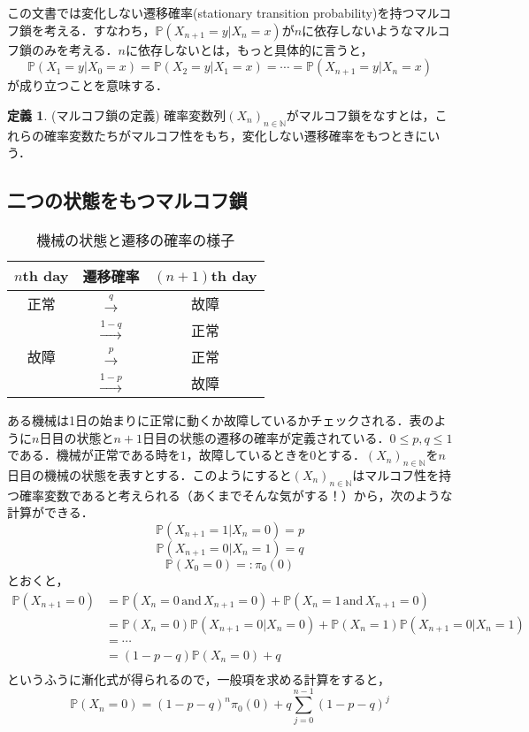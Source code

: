 \documentclass[12pt, a4paper]{jsarticle}
\theoremstyle{definition}
\newtheorem{defn}{定義}[section]
\newcommand{\NN}{{\mathbb{N}}} %
\begin{document}
この文書では変化しない遷移確率(stationary transition probability)を持つマルコフ鎖を考える．すなわち，$\mathbb{P}(X_{n+1} = y | X_n = x)$が$n$に依存しないようなマルコフ鎖のみを考える．$n$に依存しないとは，もっと具体的に言うと，
\[\mathbb{P}(X_{1} = y | X_0 = x) = \mathbb{P}(X_{2} = y | X_1 = x) = \cdots = \mathbb{P}(X_{n+1} = y | X_n = x)\]
が成り立つことを意味する．
\begin{screen}
	\begin{defn}(マルコフ鎖の定義)
		確率変数列$(X_n)_{n \in \NN}$がマルコフ鎖をなすとは，これらの確率変数たちがマルコフ性をもち，変化しない遷移確率をもつときにいう．
	\end{defn}
\end{screen}

\subsection{二つの状態をもつマルコフ鎖}
\begin{table}[h]
\caption{機械の状態と遷移の確率の様子}
\begin{center}
	\begin{tabular}{|c|c|c|} \hline
		$n$th day & 遷移確率 & $(n+1)$th day \\ \hline
		正常 & $\xrightarrow{q}$ & 故障 \\ \cline{2-3}
		\, & $\xrightarrow{1-q}$ & 正常 \\ \hline
		故障 & $\xrightarrow{p}$ & 正常 \\ \cline{2-3}
		\, & $\xrightarrow{1-p}$ & 故障 \\ \hline
	\end{tabular}
\end{center}

\end{table}
ある機械は1日の始まりに正常に動くか故障しているかチェックされる．表のように$n$日目の状態と$n+1$日目の状態の遷移の確率が定義されている．$0 \leq p,q \leq 1$である．機械が正常である時を$1$，故障しているときを$0$とする．$(X_n)_{n \in \NN}$を$n$日目の機械の状態を表すとする．このようにすると$(X_n)_{n \in \NN}$はマルコフ性を持つ確率変数であると考えられる（あくまでそんな気がする！）から，次のような計算ができる．
\[\mathbb{P}(X_{n+1} = 1|X_n = 0) = p\]
\[\mathbb{P}(X_{n+1} = 0|X_n = 1) = q\]
\[\mathbb{P}(X_0 = 0) =: \pi_0(0)\]
とおくと，
\begin{align*}
	\mathbb{P}(X_{n+1} = 0) &= \mathbb{P}(X_n = 0 \, \text{and}\, X_{n+1} = 0) + \mathbb{P}(X_n = 1 \, \text{and} \, X_{n+1} = 0) \\
	&= \mathbb{P}(X_n = 0)\mathbb{P}(X_{n+1} = 0 | X_{n} = 0) + \mathbb{P}(X_n = 1)\mathbb{P}(X_{n+1} = 0 | X_{n} = 1)\\
	&= \cdots \\
	&=(1-p-q)\mathbb{P}(X_n = 0) + q \\
\end{align*}
というふうに漸化式が得られるので，一般項を求める計算をすると，
\begin{equation}
\mathbb{P}(X_n = 0) = (1-p-q)^n\pi_0(0) + q \sum_{j=0}^{n-1}(1-p-q)^j
\end{equation}
\end{document}
